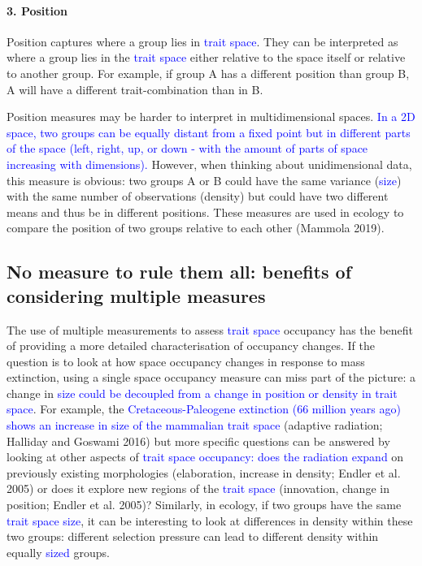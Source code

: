 \documentclass[]{article}
\let\oldparagraph\paragraph
\renewcommand{\paragraph}[1]{\oldparagraph{#1}\mbox{}}
\begin{document}
\paragraph{3. Position}\label{position}

Position captures where a group lies in
\textcolor{blue}{trait space}. They can be interpreted as
where a group lies in the \textcolor{blue}{trait space}
either relative to the space itself or relative to another group. For
example, if group A has a different position than group B, A will have a
different trait-combination than in B.

Position measures may be harder to interpret in multidimensional spaces.
\textcolor{blue}{In a 2D space, two groups can be equally distant from a fixed point but in different parts of the space (left, right, up, or down - with the amount of parts of space increasing with dimensions).}
However, when thinking about unidimensional data, this measure is
obvious: two groups A or B could have the same variance
(\textcolor{blue}{size}) with the same number of
observations (density) but could have two different means and thus be in
different positions. These measures are used in ecology to compare the
position of two groups relative to each other (Mammola 2019).

\subsection{No measure to rule them all: benefits of considering
multiple
measures}\label{no-measure-to-rule-them-all-benefits-of-considering-multiple-measures}

The use of multiple measurements to assess
\textcolor{blue}{trait space} occupancy has the benefit of
providing a more detailed characterisation of occupancy changes. If the
question is to look at how space occupancy changes in response to mass
extinction, using a single space occupancy measure can miss part of the
picture: a change in
\textcolor{blue}{size could be decoupled from a change in position or density in trait space}.
For example, the
\textcolor{blue}{Cretaceous-Paleogene extinction (66 million years ago) shows an increase in size of the mammalian trait space}
(adaptive radiation; Halliday and Goswami 2016) but more specific
questions can be answered by looking at other aspects of
\textcolor{blue}{trait space occupancy: does the radiation expand}
on previously existing morphologies (elaboration, increase in density;
Endler et al. 2005) or does it explore new regions of the
\textcolor{blue}{trait space} (innovation, change in
position; Endler et al. 2005)? Similarly, in ecology, if two groups have
the same \textcolor{blue}{trait space size}, it can be
interesting to look at differences in density within these two groups:
different selection pressure can lead to different density within
equally \textcolor{blue}{sized} groups.
\end{document}
